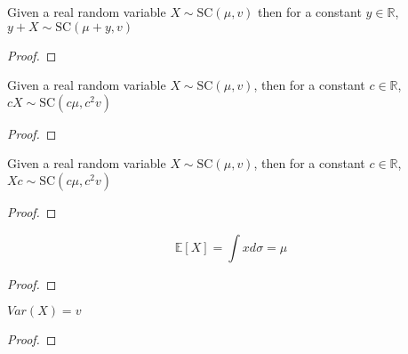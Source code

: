 \begin{lemma}\label{lem:semicircleReal_const_add}
  \mathlibok
  Given a real random variable $X \sim \mathrm{SC}(\mu, v)$
  then for a constant $y \in \mathbb{R}$, $y + X \sim \mathrm{SC}(\mu + y, v)$
  \begin{proof}

  \end{proof}
\end{lemma}


\begin{lemma}\label{lem:semicircleReal_const_mul}
  \mathlibok
  Given a real random variable $X \sim \mathrm{SC}(\mu, v)$,
  then for a constant $c \in \mathbb{R}$, $cX \sim \mathrm{SC}(c\mu , c^2v)$
  \begin{proof}

  \end{proof}
\end{lemma}


\begin{lemma}\label{lem:semicircleReal_mul_const}
  \mathlibok
   Given a real random variable $X \sim \mathrm{SC}(\mu, v)$,
  then for a constant $c \in \mathbb{R}$, $Xc \sim \mathrm{SC}(c \mu  , c^2v)$
  \begin{proof}

  \end{proof}
\end{lemma}








\begin{lemma}\label{lem:integral_id_semicircleReal}
  \notready
  $$\mathbb{E}[X] = \int x d \sigma = \mu$$
  \begin{proof}
  \end{proof}
\end{lemma}

\begin{lemma}\label{lem:variance_fun_id_semicircleReal}
  \notready
  $Var(X) = v$
  \begin{proof}
  \end{proof}
\end{lemma}


